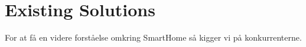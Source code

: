 \section{Existing Solutions} \label{sec:existing-solutions}

For at få en videre forståelse omkring SmartHome så kigger vi på konkurrenterne.